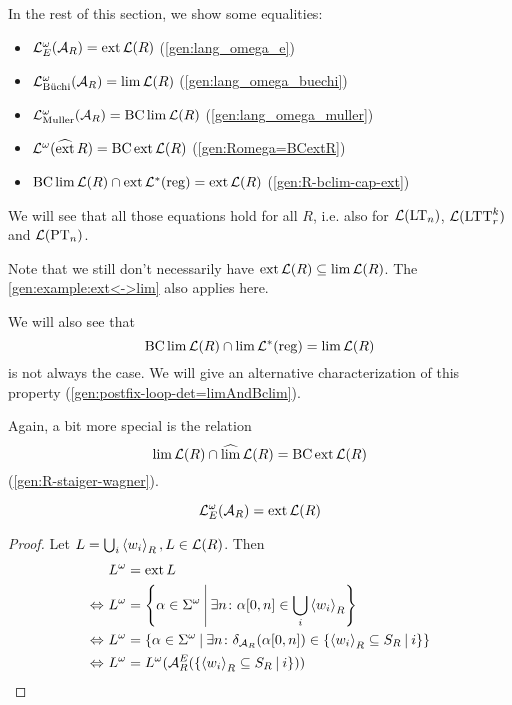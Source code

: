 In the rest of this section, we show some equalities:
\begin{itemize}
\item $\mathcal{L}^\omega_E(\mathcal{A}_R) = \operatorname{ext} \mathcal{L}(R)$ (\cref{gen:lang_omega_e})
\item $\mathcal{L}^\omega_{\text{Büchi}}(\mathcal{A}_R) = \lim \mathcal{L}(R)$ (\cref{gen:lang_omega_buechi})
\item $\mathcal{L}^\omega_{\text{Muller}}(\mathcal{A}_R) = \operatorname{BC} \lim \mathcal{L}(R)$ (\cref{gen:lang_omega_muller})
\item $\mathcal{L}^\omega(\operatorname{\widehat{ext}} R) = \operatorname{BC} \operatorname{ext} \mathcal{L}(R)$ (\cref{gen:Romega=BCextR})
\item $\operatorname{BC} \lim \mathcal{L}(R) \cap \operatorname{ext} \mathcal{L}^*(\textup{\textrm{reg}}) = \operatorname{ext} \mathcal{L}(R)$ (\cref{gen:R-bclim-cap-ext})
\end{itemize}

We will see that all those equations hold for all $R$, i.e. also for $\mathcal{L}(\textup{\textrm{LT}}_n)$, $\mathcal{L}(\textup{\textrm{LTT}}^k_r)$ and $\mathcal{L}(\textup{\textrm{PT}}_n)$.

Note that we still don't necessarily have $\operatorname{ext} \mathcal{L}(R) \subseteq \lim \mathcal{L}(R)$. The \cref{gen:example:ext<->lim} also applies here.

We will also see that
\[ \operatorname{BC} \lim \mathcal{L}(R) \cap \lim \mathcal{L}^*(\textup{\textrm{reg}}) = \lim \mathcal{L}(R) \]
is not always the case. We will give an alternative characterization of this property (\cref{gen:postfix-loop-det=limAndBclim}).

Again, a bit more special is the relation
\[ \lim \mathcal{L}(R) \cap \operatorname{\widehat{lim}} \mathcal{L}(R) = \operatorname{BC} \operatorname{ext} \mathcal{L}(R) \]
(\cref{gen:R-staiger-wagner}).

\begin{lemma}
\label{gen:lang_omega_e}
\[ \mathcal{L}^\omega_E(\mathcal{A}_R) = \operatorname{ext} \mathcal{L}(R) \]
\begin{proof}
Let $L = \bigcup_i \left< w_i\right>_R, L \in \mathcal{L}(R)$. Then
\begin{align*}
& L^\omega = \ext L \\
\Leftrightarrow \ & L^\omega = \Set{\alpha \in \Sigma^\omega}{\exists n \colon \alpha[0,n] \in \bigcup_i \left< w_i\right>_R} \\
\Leftrightarrow \ & L^\omega = \Set{\alpha \in \Sigma^\omega}{\exists n \colon \delta_{\A_R}(\alpha[0,n]) \in \Set{\left< w_i\right>_R \subseteq S_R}{i}} \\
\Leftrightarrow \ & L^\omega = L^\omega(\A^E_R(\Set{\left< w_i\right>_R \subseteq S_R}{i}))
\end{align*}
\end{proof}
\end{lemma}

